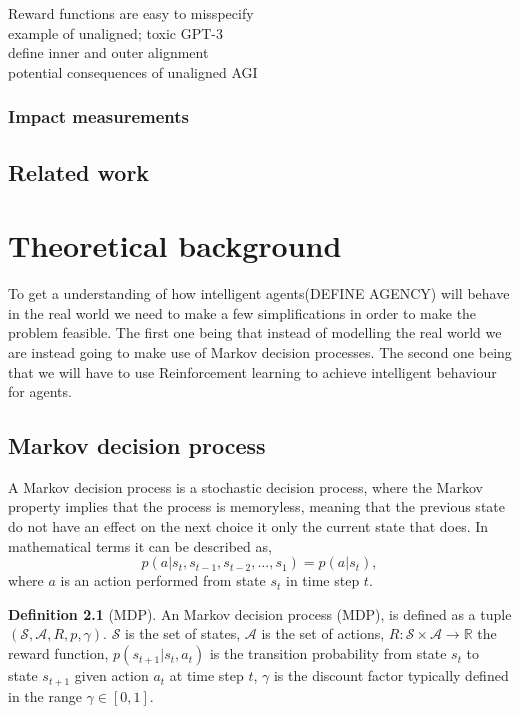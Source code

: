 \documentclass{report}
\theoremstyle{definition}
\newtheorem{definition}{Definition}[section]
\begin{document}
Reward functions are easy to misspecify\\

example of unaligned; toxic GPT-3\\

define inner and outer alignment\\

potential consequences of unaligned AGI\\

\subsection{Impact measurements}

\section{Related work}




\chapter{Theoretical background}
To get a understanding of how intelligent agents(DEFINE AGENCY) will behave in the real world we need to make a few simplifications in order to make the problem feasible. The first one being that instead of modelling the real world we are instead going to make use of Markov decision processes. The second one being that we will have to use Reinforcement learning to achieve intelligent behaviour for agents. 

\section{Markov decision process}
A Markov decision process is a stochastic decision process, where the Markov property implies that the process is memoryless, meaning that the previous state do not have an effect on the next choice it only the current state that does. In mathematical terms it can be described as,
\[ p(a|s_t, s_{t-1}, s_{t-2}, ... , s_1) = p(a|s_t),\]
where $a$ is an action performed from state $s_t$ in time step $t$.

\begin{definition}[MDP]
    An Markov decision process (MDP), is defined as a tuple $(\mathcal{S}, \mathcal{A}, R, p, \gamma)$. $\mathcal{S}$ is the set of states, $\mathcal{A}$ is the set of actions, $R: \mathcal{S} \times \mathcal{A} \rightarrow \mathbb{R}$ the reward function, $p(s_{t+1}|s_t, a_t)$ is the transition probability from state $s_t$ to state $s_{t+1}$ given action $a_t$ at time step $t$, $\gamma$ is the discount factor typically defined in the range $\gamma \in [0, 1]$.
\end{definition}
\end{document}
